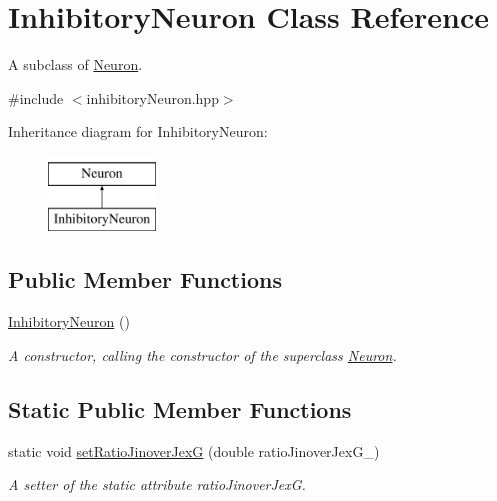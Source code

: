 \hypertarget{classInhibitoryNeuron}{\section{Inhibitory\-Neuron Class Reference}
\label{classInhibitoryNeuron}
}


A subclass of \hyperlink{classNeuron}{Neuron}.  




{\ttfamily \#include $<$inhibitory\-Neuron.\-hpp$>$}

Inheritance diagram for Inhibitory\-Neuron\-:\begin{figure}[H]
\begin{center}
\leavevmode
\includegraphics[height=2.000000cm]{classInhibitoryNeuron}
\end{center}
\end{figure}
\subsection*{Public Member Functions}
\begin{DoxyCompactItemize}
\item 
\hypertarget{classInhibitoryNeuron_a05c384032408c8c30c0801f96aecc5f8}{\hyperlink{classInhibitoryNeuron_a05c384032408c8c30c0801f96aecc5f8}{Inhibitory\-Neuron} ()}\label{classInhibitoryNeuron_a05c384032408c8c30c0801f96aecc5f8}

\begin{DoxyCompactList}\small\item\em A constructor, calling the constructor of the superclass \hyperlink{classNeuron}{Neuron}. \end{DoxyCompactList}\end{DoxyCompactItemize}
\subsection*{Static Public Member Functions}
\begin{DoxyCompactItemize}
\item 
static void \hyperlink{classInhibitoryNeuron_a68a66521c5f33a5a01482e752fb1a72c}{set\-Ratio\-Jinover\-Jex\-G} (double ratio\-Jinover\-Jex\-G\-\_\-)
\begin{DoxyCompactList}\small\item\em A setter of the static attribute ratio\-Jinover\-Jex\-G. \end{DoxyCompactList}\end{DoxyCompactItemize}
